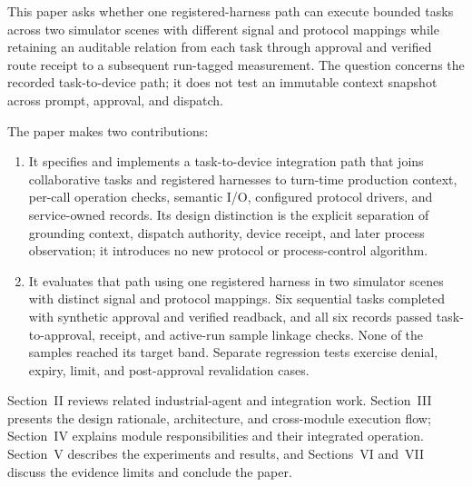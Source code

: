 This paper asks whether one registered-harness path can execute bounded tasks
across two simulator scenes with different signal and protocol mappings while
retaining an auditable relation from each task through approval and verified
route receipt to a subsequent run-tagged measurement. The question concerns
the recorded task-to-device path; it does not test an immutable context
snapshot across prompt, approval, and dispatch.

The paper makes two contributions:
\begin{enumerate}
\item It specifies and implements a task-to-device integration path that
  joins collaborative tasks and registered harnesses to turn-time production
  context, per-call operation checks, semantic I/O, configured protocol
  drivers, and service-owned records. Its design distinction is the explicit
  separation of grounding context, dispatch authority, device receipt, and
  later process observation; it introduces no new protocol or
  process-control algorithm.
\item It evaluates that path using one registered harness in two simulator
  scenes with distinct signal and protocol mappings. Six sequential tasks
  completed with synthetic approval and verified readback, and all six
  records passed task-to-approval, receipt, and active-run sample linkage
  checks. None of the samples reached its target band. Separate regression
  tests exercise denial, expiry, limit, and post-approval revalidation cases.
\end{enumerate}

Section~II reviews related industrial-agent and integration work.
Section~III presents the design rationale, architecture, and cross-module
execution flow; Section~IV explains module responsibilities and their
integrated operation. Section~V describes the experiments and results, and
Sections~VI and~VII discuss the evidence limits and conclude the paper.
